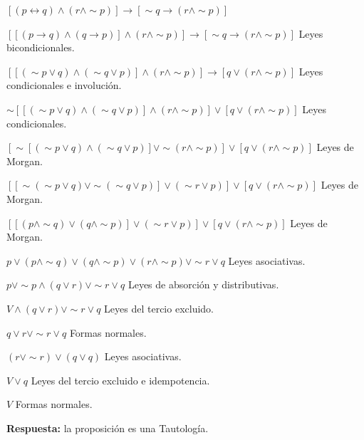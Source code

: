 \documentclass[12pt]{article}
\begin{document}
\begin{itemize}
\begin{enumerate}
                        \par{\large$[(p \leftrightarrow q) \wedge (r \wedge \sim p)] \longrightarrow [\sim q \longrightarrow (r \wedge \sim p)]$} \vspace{0.5cm}
                        \par$[[(p \longrightarrow q) \wedge (q \longrightarrow p)] \wedge (r \wedge \sim p)] \longrightarrow [\sim q \longrightarrow (r \wedge \sim p)]$ {\footnotesize Leyes bicondicionales.}
                        \par$[[(\sim p \vee q) \wedge (\sim q \vee p)] \wedge (r \wedge \sim p)] \longrightarrow [q \vee (r \wedge \sim p)]$ {\footnotesize Leyes condicionales e involución.}
                        \par$\sim [[(\sim p \vee q) \wedge (\sim q \vee p)] \wedge (r \wedge \sim p)] \vee [q \vee (r \wedge \sim p)]$ {\footnotesize Leyes condicionales.}
                        \par$[\sim [(\sim p \vee q) \wedge  (\sim q \vee p)] \vee \sim (r \wedge \sim p)] \vee [q \vee (r \wedge \sim p)]$ {\footnotesize Leyes de Morgan.}
                        \par$[[\sim (\sim p \vee q) \vee \sim (\sim q \vee p)] \vee (\sim r \vee  p)] \vee [q \vee (r \wedge \sim p)]$ {\footnotesize Leyes de Morgan.}
                        \par$[[(p \wedge \sim q) \vee  (q \wedge \sim p)] \vee (\sim r \vee  p)] \vee [q \vee (r \wedge \sim p)]$ {\footnotesize Leyes de Morgan.}
                        \par$p \vee (p \wedge \sim q)  \vee (q \wedge \sim p) \vee (r \wedge \sim p) \vee \sim r  \vee q$ {\footnotesize Leyes asociativas.}
                        \par$p  \vee  \sim p \wedge (q \vee r) \vee \sim r  \vee q$ {\footnotesize Leyes de absorción y distributivas.}
                        \par$V \wedge (q \vee r) \vee \sim r  \vee q$  {\footnotesize Leyes del tercio excluido.}
                        \par$q \vee r \vee \sim r  \vee q$ {\footnotesize Formas normales.}
                        \par$(r \vee \sim r) \vee (q \vee q)$ {\footnotesize Leyes asociativas.}
                        \par$V \vee q$ {\footnotesize Leyes del tercio excluido e idempotencia.}
                        \par$V$ {\footnotesize Formas normales.} \vspace{0.5cm}
                        \par\textbf{Respuesta: } la proposición es una Tautología. \vspace{0.5cm}
                

\end{enumerate}
\end{itemize}
\end{document}

